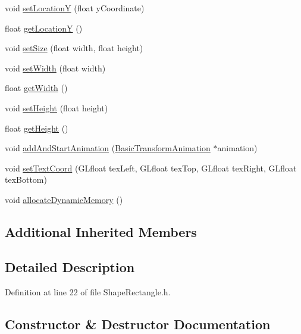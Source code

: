 \begin{DoxyCompactItemize}
\item 
void \hyperlink{class_shape_rectangle_ae0e4300d339e074856f2eb971642f0e1}{set\+Location\+Y} (float y\+Coordinate)
\item 
float \hyperlink{class_shape_rectangle_a625f77516f1a81c2394ffb366dac0cde}{get\+Location\+Y} ()
\item 
void \hyperlink{class_shape_rectangle_ab7c98e1ae45dcbeacda467e6c3248c65}{set\+Size} (float width, float height)
\item 
void \hyperlink{class_shape_rectangle_a56813e435437b7bdee9934879306eccd}{set\+Width} (float width)
\item 
float \hyperlink{class_shape_rectangle_a698aef9d35f44b45581ff973e5ca5d66}{get\+Width} ()
\item 
void \hyperlink{class_shape_rectangle_a033d903ad36dce1759c413b505648eb3}{set\+Height} (float height)
\item 
float \hyperlink{class_shape_rectangle_aa23913713b8e6df47e320be6f2df82f2}{get\+Height} ()
\item 
void \hyperlink{class_shape_rectangle_aa7e763889f9695eff2992de3af9f626c}{add\+And\+Start\+Animation} (\hyperlink{class_basic_transform_animation}{Basic\+Transform\+Animation} $\ast$animation)
\item 
void \hyperlink{class_shape_rectangle_a334fccb8c9cf4146747a1378eae0cee5}{set\+Text\+Coord} (G\+Lfloat tex\+Left, G\+Lfloat tex\+Top, G\+Lfloat tex\+Right, G\+Lfloat tex\+Bottom)
\item 
void \hyperlink{class_shape_rectangle_a65b4601964e17f7221827a303bcedd4e}{allocate\+Dynamic\+Memory} ()
\end{DoxyCompactItemize}
\subsection*{Additional Inherited Members}


\subsection{Detailed Description}


Definition at line 22 of file Shape\+Rectangle.\+h.



\subsection{Constructor \& Destructor Documentation}
\hypertarget{class_shape_rectangle_a8cdb8cd9d0fa3c64d5a269dd9b8181ac}{}

